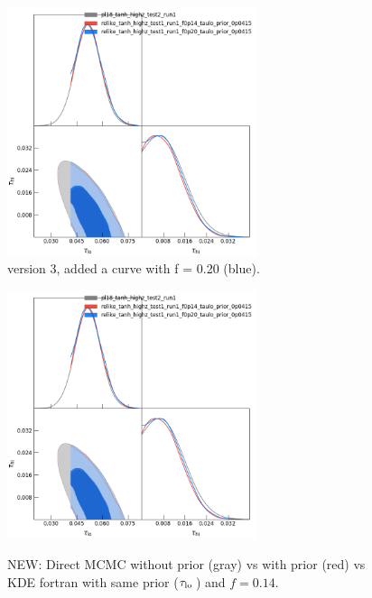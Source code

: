 \documentclass[prd,amsmath,amssymb,floatfix,superscriptaddress,nofootinbib]{revtex4-1}
\newcommand{\taulo}{$\tau_{\rm lo}\,$}
\begin{document}
\begin{figure}
\includegraphics[width=0.65\textwidth]{cosmomc_kde/pl18_tanh_highz_test2_run1_vs_relike_tanh_highz_test1_run1_f0p14_and_f0p20_taulo_prior_0p0415_tri.png}
\caption{version 3, added a curve with f = 0.20 (blue).
}
\label{fig:}
\end{figure}

\begin{figure}
\includegraphics[width=0.65\textwidth]{cosmomc_kde/pl18_tanh_highz_test2_run1_vs_relike_tanh_highz_test1_run1_f0p14_and_f0p20_taulo_prior_0p0415_tri.png}
\label{fig:}
\caption{NEW: Direct MCMC without prior (gray) vs with prior (red) vs KDE fortran with same prior (\taulo {}) and $f = 0.14$.
} 
\end{figure}
\end{document}
